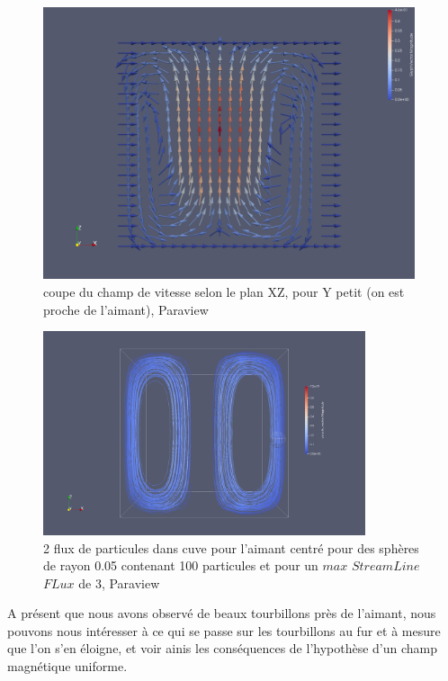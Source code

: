 \documentclass[a4paper,12pt,titlepage]{report}
\begin{document}
\begin{onehalfspace}
\begin{figure}[!h]
\begin{center}
\includegraphics[height = 8cm, keepaspectratio]{graphes/Paraview/coupe_aimant_centre.png} 
\caption{\label{figure 31 } coupe du champ de vitesse selon le plan XZ, pour Y petit (on est proche de l'aimant), Paraview}
\end{center}
\end{figure}



\begin{figure}[!h]
\begin{center}
\includegraphics[height = 6cm, keepaspectratio]{graphes/Paraview/flux_aimant_centre_100pt_length4.png} 
\caption{\label{figure 32 }2 flux de particules dans cuve pour l'aimant centré pour des sphères de rayon 0.05 contenant 100 particules et pour un $max$ $StreamLine$ $FLux$ de 3, Paraview}
\end{center}
\end{figure}

A présent que nous avons observé de beaux tourbillons près de l'aimant, nous pouvons nous intéresser à ce qui se passe sur les tourbillons au fur et à mesure que l'on s'en éloigne, et voir ainis les conséquences de l'hypothèse d'un champ magnétique uniforme. 


\end{onehalfspace}
\end{document}
